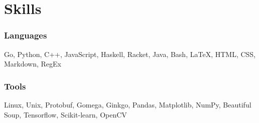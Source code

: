 \section{Skills}

\begin{resumeItem}
\subsubsection{Languages}
Go, Python, C++, JavaScript, Haskell, Racket, Java, Bash, {\LaTeX}, HTML, CSS, Markdown, RegEx

\subsubsection{Tools}
Linux, Unix, Protobuf, Gomega, Ginkgo, Pandas, Matplotlib, NumPy, Beautiful Soup, Tensorflow, Scikit-learn, OpenCV
\end{resumeItem}

